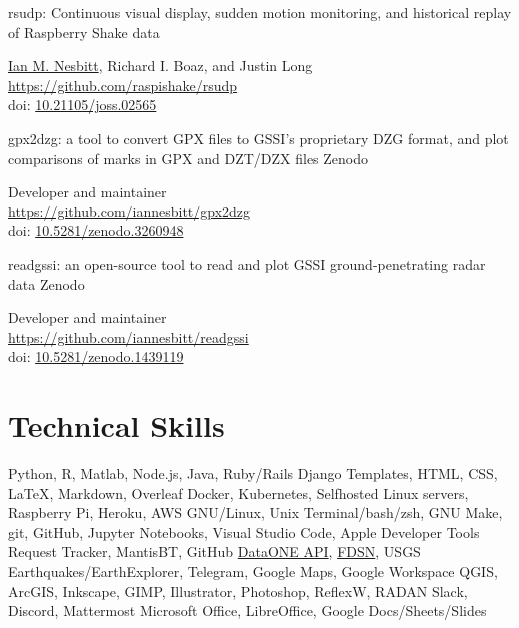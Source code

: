 \documentclass[a4paper,12pt,sans,colorlinks]{moderncv}
\newcommand{\me}{\href{https://www.iannesbitt.org}{Ian M. Nesbitt}}
\newcommand{\richard}{Richard I. Boaz}
\newcommand{\fdsn}{\href{https://www.fdsn.org/services/}{FDSN}}
\newcommand{\dataoneapi}{\href{https://search.dataone.org/api}{DataONE API}}
\newcommand{\doi}[1]{%
    \href{https://doi.org/#1}{#1}
}
\begin{document}
{rsudp: Continuous visual display, sudden motion monitoring,
and historical replay of Raspberry Shake data}
{}
{}
{}
{
    \me{}, \richard{}, and Justin Long
    \\
    \url{https://github.com/raspishake/rsudp}
    \\
    doi: \doi{10.21105/joss.02565}
}

{gpx2dzg: a tool to convert GPX files to GSSI's proprietary DZG
format, and plot comparisons of marks in GPX and DZT/DZX files}
{Zenodo}
{}
{}
{
    Developer and maintainer
    \\
    \url{https://github.com/iannesbitt/gpx2dzg}
    \\
    doi: \doi{10.5281/zenodo.3260948}
}

{readgssi: an open-source tool to read and plot GSSI
ground-penetrating radar data}
{Zenodo}
{}
{}
{
    Developer and maintainer
    \\
    \url{https://github.com/iannesbitt/readgssi}
    \\
    doi: \doi{10.5281/zenodo.1439119}
}





\section{Technical Skills}

{
    Python, R, Matlab, Node.js, Java, Ruby/Rails
}
{
    Django Templates, HTML, CSS, \LaTeX, Markdown, Overleaf
}
{
    Docker, Kubernetes, Selfhosted Linux servers, Raspberry Pi, Heroku, AWS
}
{
    GNU/Linux, Unix Terminal/bash/zsh, GNU Make, git, GitHub, Jupyter
    Notebooks, Visual Studio Code, Apple Developer Tools
}
{
    Request Tracker, MantisBT, GitHub
}
{
    \dataoneapi, \fdsn, USGS Earthquakes/EarthExplorer, Telegram, Google
    Maps, Google Workspace
}
{
    QGIS, ArcGIS, Inkscape, GIMP, Illustrator, Photoshop, ReflexW, RADAN
}
{
    Slack, Discord, Mattermost
}
{
    Microsoft Office, LibreOffice, Google Docs/Sheets/Slides
}
\end{document}
